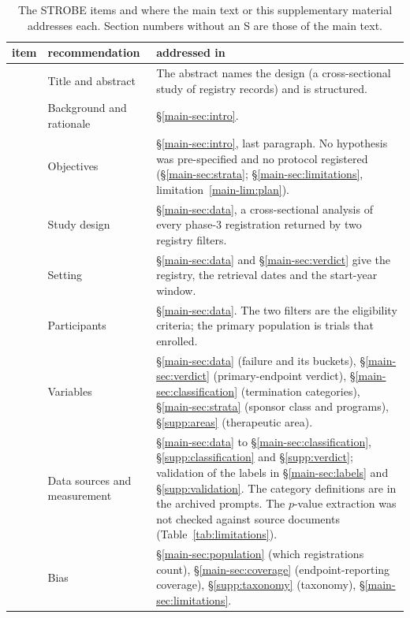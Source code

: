 \documentclass[11pt]{article}
\newcounter{strobe}
\newcommand{\strobeitem}{\stepcounter{strobe}\arabic{strobe}}
\begin{document}
\begin{table}[H]
\centering
\caption{The STROBE items and where the main text or this supplementary material addresses each. Section numbers without an S are those of the main text.}
\label{tab:strobe}
\footnotesize
\begin{tabular}{r>{\raggedright\arraybackslash}p{}>{\raggedright\arraybackslash}p{}}
\toprule
item & recommendation & addressed in \\
\midrule
\strobeitem & Title and abstract & The abstract names the design (a cross-sectional study of registry records) and is structured. \\
\strobeitem & Background and rationale & \S\ref{main-sec:intro}. \\
\strobeitem & Objectives & \S\ref{main-sec:intro}, last paragraph. No hypothesis was pre-specified and no protocol registered (\S\ref{main-sec:strata}; \S\ref{main-sec:limitations}, limitation~\ref{main-lim:plan}). \\
\strobeitem & Study design & \S\ref{main-sec:data}, a cross-sectional analysis of every phase-3 registration returned by two registry filters. \\
\strobeitem & Setting & \S\ref{main-sec:data} and \S\ref{main-sec:verdict} give the registry, the retrieval dates and the start-year window. \\
\strobeitem & Participants & \S\ref{main-sec:data}. The two filters are the eligibility criteria; the primary population is trials that enrolled. \\
\strobeitem & Variables & \S\ref{main-sec:data} (failure and its buckets), \S\ref{main-sec:verdict} (primary-endpoint verdict), \S\ref{main-sec:classification} (termination categories), \S\ref{main-sec:strata} (sponsor class and programs), \S\ref{supp:areas} (therapeutic area). \\
\strobeitem & Data sources and measurement & \S\ref{main-sec:data} to \S\ref{main-sec:classification}, \S\ref{supp:classification} and \S\ref{supp:verdict}; validation of the labels in \S\ref{main-sec:labels} and \S\ref{supp:validation}. The category definitions are in the archived prompts. The $p$-value extraction was not checked against source documents (Table~\ref{tab:limitations}). \\
\strobeitem & Bias & \S\ref{main-sec:population} (which registrations count), \S\ref{main-sec:coverage} (endpoint-reporting coverage), \S\ref{supp:taxonomy} (taxonomy), \S\ref{main-sec:limitations}. \\

\end{tabular}
\end{table}
\end{document}
